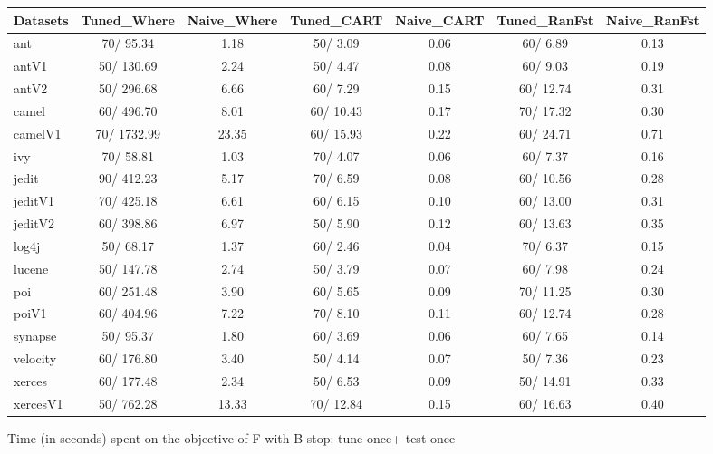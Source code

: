 \documentclass{acm_proc_article-sp}
\begin{document}
\begin{figure*}[!ht]
\scriptsize
\centering
  \begin{tabular}{l|c |c |c |c |c |c }
    \hline\hline
    Datasets & Tuned\_Where & Naive\_Where & Tuned\_CART & Naive\_CART & Tuned\_RanFst & Naive\_RanFst\\
    \hline
    ant & 70/ 95.34 & 1.18 & 50/ 3.09 & 0.06 & 60/ 6.89 & 0.13\\
    antV1 & 50/ 130.69 & 2.24 & 50/ 4.47 & 0.08 & 60/ 9.03 & 0.19\\
    antV2 & 50/ 296.68 & 6.66 & 60/ 7.29 & 0.15 & 60/ 12.74 & 0.31\\
    camel & 60/ 496.70 & 8.01 & 60/ 10.43 & 0.17 & 70/ 17.32 & 0.30\\
    camelV1 & 70/ 1732.99 & 23.35 & 60/ 15.93 & 0.22 & 60/ 24.71 & 0.71\\
    ivy & 70/ 58.81 & 1.03 & 70/ 4.07 & 0.06 & 60/ 7.37 & 0.16\\
    jedit & 90/ 412.23 & 5.17 & 70/ 6.59 & 0.08 & 60/ 10.56 & 0.28\\
    jeditV1 & 70/ 425.18 & 6.61 & 60/ 6.15 & 0.10 & 60/ 13.00 & 0.31\\
    jeditV2 & 60/ 398.86 & 6.97 & 50/ 5.90 & 0.12 & 60/ 13.63 & 0.35\\
    log4j & 50/ 68.17 & 1.37 & 60/ 2.46 & 0.04 & 70/ 6.37 & 0.15\\
    lucene & 50/ 147.78 & 2.74 & 50/ 3.79 & 0.07 & 60/ 7.98 & 0.24\\
    poi & 60/ 251.48 & 3.90 & 60/ 5.65 & 0.09 & 70/ 11.25 & 0.30\\
    poiV1 & 60/ 404.96 & 7.22 & 70/ 8.10 & 0.11 & 60/ 12.74 & 0.28\\
    synapse & 50/ 95.37 & 1.80 & 60/ 3.69 & 0.06 & 60/ 7.65 & 0.14\\
    velocity & 60/ 176.80 & 3.40 & 50/ 4.14 & 0.07 & 50/ 7.36 & 0.23\\
    xerces & 60/ 177.48 & 2.34 & 50/ 6.53 & 0.09 & 50/ 14.91 & 0.33\\
    xercesV1 & 50/ 762.28 & 13.33 & 70/ 12.84 & 0.15 & 60/ 16.63 & 0.40\\
  \end{tabular}
  \caption{Time (in seconds) spent on the objective of F with B stop: tune once+ test once}
\end{figure*}
\end{document}
